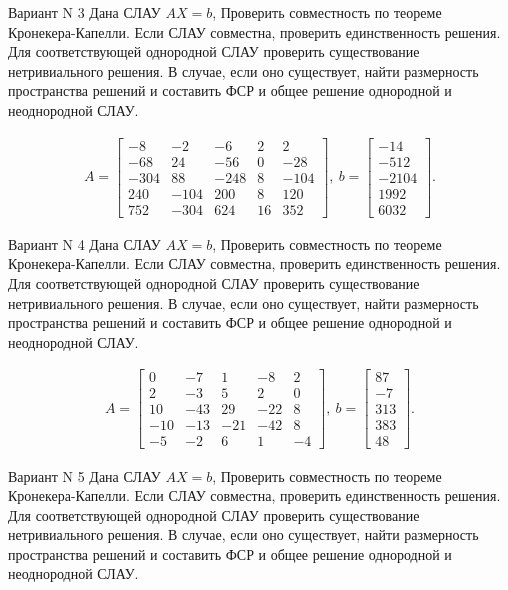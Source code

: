 \documentclass[11pt]{report}
\begin{document}
Вариант N 3
Дана СЛАУ $AX = b$,
Проверить совместность по теореме Кронекера-Капелли. Если СЛАУ совместна, проверить единственность решения.
Для соответствующей однородной СЛАУ проверить существование нетривиального решения. В случае, если оно существует,
найти размерность пространства решений и составить ФСР и общее решение однородной  и неоднородной СЛАУ.


\begin{align*}
 A = \left[\begin{matrix}-8 & -2 & -6 & 2 & 2\\-68 & 24 & -56 & 0 & -28\\-304 & 88 & -248 & 8 & -104\\240 & -104 & 200 & 8 & 120\\752 & -304 & 624 & 16 & 352\end{matrix}\right],
\ b = \left[\begin{matrix}-14\\-512\\-2104\\1992\\6032\end{matrix}\right]. 
 \end{align*}

Вариант N 4
Дана СЛАУ $AX = b$,
Проверить совместность по теореме Кронекера-Капелли. Если СЛАУ совместна, проверить единственность решения.
Для соответствующей однородной СЛАУ проверить существование нетривиального решения. В случае, если оно существует,
найти размерность пространства решений и составить ФСР и общее решение однородной  и неоднородной СЛАУ.


\begin{align*}
 A = \left[\begin{matrix}0 & -7 & 1 & -8 & 2\\2 & -3 & 5 & 2 & 0\\10 & -43 & 29 & -22 & 8\\-10 & -13 & -21 & -42 & 8\\-5 & -2 & 6 & 1 & -4\end{matrix}\right],
\ b = \left[\begin{matrix}87\\-7\\313\\383\\48\end{matrix}\right]. 
 \end{align*}

Вариант N 5
Дана СЛАУ $AX = b$,
Проверить совместность по теореме Кронекера-Капелли. Если СЛАУ совместна, проверить единственность решения.
Для соответствующей однородной СЛАУ проверить существование нетривиального решения. В случае, если оно существует,
найти размерность пространства решений и составить ФСР и общее решение однородной  и неоднородной СЛАУ.
\end{document}
